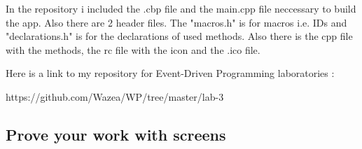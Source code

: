 In the repository i included the .cbp file and the main.cpp file neccessary to build the app. Also there are 2 header files. The "macros.h" is for macros i.e. IDs and "declarations.h" is for the declarations of used methods. Also there is the cpp file with the methods, the rc file with the icon and the .ico file. 

Here is a link to my repository for Event-Driven Programming laboratories : 

https://github.com/Wazea/WP/tree/master/lab-3

\subsection{Prove your work with screens}



\clearpage